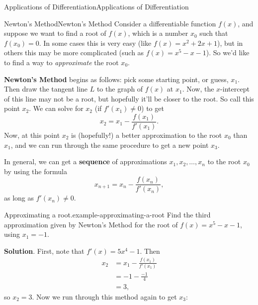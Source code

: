 \documentclass[10pt,]{book}
\newcommand{\terminology}[1]{\textbf{#1}}
\numberwithin{equation}{section}
\begin{document}
\begin{chapterptx}{Applications of Differentiation}{}{Applications of Differentiation}{}{}
%
%
\typeout{************************************************}
\typeout{************************************************}
%
\begin{sectionptx}{Newton's Method}{}{Newton's Method}{}{}\label{section-newton-s-method}
\hypertarget{p-366}{}%
Consider a differentiable function \(f(x)\), and suppose we want to find a root of \(f(x)\), which is a number \(x_{0}\) such that \(f(x_{0}) = 0\). In some cases this is very easy (like \(f(x) = x^{2} + 2x + 1\)), but in others this may be more complicated (such as \(f(x) = x^{5} - x  - 1\)). So we'd like to find a way to \emph{approximate} the root \(x_{0}\).%
\par
\hypertarget{p-367}{}%
\terminology{Newton's Method} begins as follows: pick some starting point, or guess, \(x_{1}\). Then draw the tangent line \(L\) to the graph of \(f(x)\) at \(x_{1}\). Now, the \(x\)-intercept of this line may not be a root, but hopefully it'll be closer to the root. So call this point \(x_{2}\). We can solve for \(x_{2}\) (if \(f'(x_{1})\neq0\)) to get%
\begin{equation*}
x_{2} = x_{1} - \frac{f(x_{1})}{f'(x_{1})}.
\end{equation*}
Now, at this point \(x_{2}\) is (hopefully!) a better approximation to the root \(x_{0}\) than \(x_{1}\), and we can run through the same procedure to get a new point \(x_{3}\).%
\par
\hypertarget{p-368}{}%
In general, we can get a \terminology{sequence} of approximations \(x_{1},x_{2},\ldots,x_{n}\) to the root \(x_{0}\) by using the formula%
\begin{equation*}
x_{n+1} = x_{n} - \frac{f(x_{n})}{f'(x_{n})},
\end{equation*}
as long as \(f'(x_{n}) \neq0\).%
\begin{example}{Approximating a root.}{example-approximating-a-root}%
\hypertarget{p-369}{}%
Find the third approximation given by Newton's Method for the root of \(f(x) = x^{5} - x - 1\), using \(x_{1} = -1\).%
\par\smallskip%
\noindent\textbf{Solution}.\hypertarget{solution-81}{}\quad%
\hypertarget{p-370}{}%
First, note that \(f'(x) = 5x^{4} - 1\). Then%
\begin{align*}
x_{2} & = x_{1} - \frac{f(x_{1})}{f'(x_{1})} \\
& = -1 - \frac{-1}{4} \\
& = 3, 
\end{align*}
so \(x_{2} = 3\). Now we run through this method again to get \(x_{3}\):%

\end{example}
\end{sectionptx}
\end{chapterptx}
\end{document}
